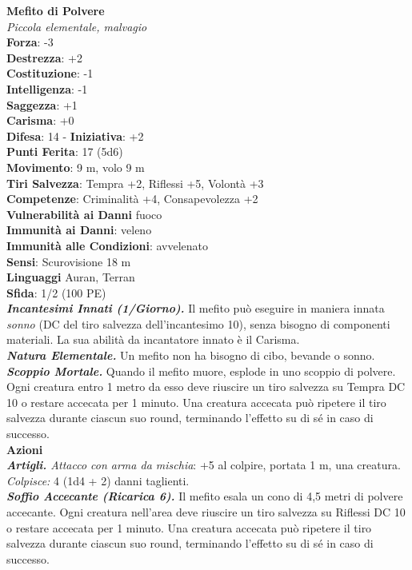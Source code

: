 \begin{multicols}{2}
\medskip\textbf{Mefito di Polvere}\\
\emph{Piccola elementale, malvagio}\\
\textbf{Forza}: -3\\
\textbf{Destrezza}: +2\\
\textbf{Costituzione}: -1\\
\textbf{Intelligenza}: -1\\
\textbf{Saggezza}: +1\\
\textbf{Carisma}: +0\\
\textbf{Difesa}: 14 - \textbf{Iniziativa}: +2\\
\textbf{Punti Ferita}: 17 (5d6)\\
\textbf{Movimento}: 9 m, volo 9 m\\
\textbf{Tiri Salvezza}: Tempra +2, Riflessi +5, Volontà +3\\
\textbf{Competenze}: Criminalità +4, Consapevolezza +2\\
\textbf{Vulnerabilità ai Danni} fuoco\\
\textbf{Immunità ai Danni}: veleno\\
\textbf{Immunità alle Condizioni}: avvelenato\\
\textbf{Sensi}: Scurovisione 18 m\\
\textbf{Linguaggi} Auran, Terran\\
\textbf{Sfida}: 1/2 (100 PE)\smallskip\\
\emph{\textbf{Incantesimi Innati (1/Giorno).}} Il mefito può eseguire in maniera innata \emph{sonno} (DC del tiro salvezza dell'incantesimo 10), senza bisogno di componenti materiali. La sua abilità da incantatore innato è il Carisma.\\
\emph{\textbf{Natura Elementale.}} Un mefito non ha bisogno di cibo, bevande o sonno.\\
\emph{\textbf{Scoppio Mortale.}} Quando il mefito muore, esplode in uno scoppio di polvere. Ogni creatura entro 1 metro da esso deve riuscire un tiro salvezza su Tempra DC 10 o restare accecata per 1 minuto. Una creatura accecata può ripetere il tiro salvezza durante ciascun suo round, terminando l'effetto su di sé in caso di successo. \\
\smallskip\textbf{Azioni}\\
\emph{\textbf{Artigli.} Attacco con arma da mischia}: +5 al colpire, portata 1 m, una creatura.\\
\emph{Colpisce:} 4 (1d4 + 2) danni taglienti.\\
\emph{\textbf{Soffio Accecante (Ricarica 6).}} Il mefito esala un cono di 4,5 metri di polvere accecante. Ogni creatura nell'area deve riuscire un tiro salvezza su Riflessi DC 10 o restare accecata per 1 minuto. Una creatura accecata può ripetere il tiro salvezza durante ciascun suo round, terminando l'effetto su di sé in caso di successo.\\

\end{multicols}
